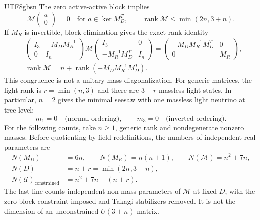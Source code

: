 \documentclass[11pt,a4paper,oneside]{report}
\begin{document}
\begin{CJK*}{UTF8}{gbsn}
The zero active-active block implies
\begin{equation*}
\mathcal M\begin{pmatrix}a\\0\end{pmatrix}=0
\quad\text{for }a\in\ker M_D^T,\qquad
\operatorname{rank}\mathcal M\le\min(2n,3+n).
\tag{6.14}\label{eq:6.14}
\end{equation*}
If $M_R$ is invertible, block elimination gives the exact rank identity
\begin{equation*}
\begin{aligned}
&\begin{pmatrix}I_3&-M_DM_R^{-1}\\0&I_n\end{pmatrix}
\mathcal M
\begin{pmatrix}I_3&0\\-M_R^{-1}M_D^T&I_n\end{pmatrix}
=\begin{pmatrix}-M_DM_R^{-1}M_D^T&0\\0&M_R\end{pmatrix},\\
&\operatorname{rank}\mathcal M
=n+\operatorname{rank}(-M_DM_R^{-1}M_D^T).
\end{aligned}
\tag{6.15}\label{eq:6.15}
\end{equation*}
This congruence is not a unitary mass diagonalization. For generic matrices, the light rank is $r=\min(n,3)$ and there are $3-r$ massless light states. In particular, $n=2$ gives the minimal seesaw with one massless light neutrino at tree level:
\begin{equation*}
m_1=0\quad\text{(normal ordering)},\qquad
m_3=0\quad\text{(inverted ordering)}.
\tag{6.16}\label{eq:6.16}
\end{equation*}
For the following counts, take $n\ge1$, generic rank and nondegenerate nonzero masses. Before quotienting by field redefinitions, the numbers of independent real parameters are
\begin{equation*}
\begin{aligned}
N(M_D)&=6n,\qquad N(M_R)=n(n+1),\qquad N(\mathcal M)=n^2+7n,\\
N(D)&=n+r=\min(2n,3+n),\\
N(\mathcal U)_{\mathrm{constrained}}
&=n^2+7n-(n+r).
\end{aligned}
\tag{6.17}\label{eq:6.17}
\end{equation*}
The last line counts independent non-mass parameters of $\mathcal M$ at fixed $D$, with the zero-block constraint imposed and Takagi stabilizers removed. It is not the dimension of an unconstrained $U(3+n)$ matrix.


\end{CJK*}
\end{document}

